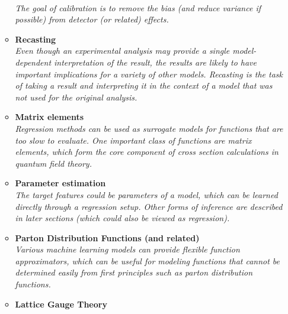 \documentclass[12pt,letterpaper]{article}
\begin{document}
\begin{itemize}
\begin{itemize}
		\\\textit{The goal of calibration is to remove the bias (and reduce variance if possible) from detector (or related) effects.}
		\item \textbf{Recasting}~\cite{Caron:2017hku,Bertone:2016mdy,1806026,Hammad:2022wpq}
		\\\textit{Even though an experimental analysis may provide a single model-dependent interpretation of the result, the results are likely to have important implications for a variety of other models.  Recasting is the task of taking a result and interpreting it in the context of a model that was not used for the original analysis.}
		\item \textbf{Matrix elements}~\cite{Badger:2020uow,Bishara:2019iwh,1804325,Bury:2020ewi,Sombillo:2021yxe,Sombillo:2021rxv,Aylett-Bullock:2021hmo,Maitre:2021uaa,Danziger:2021eeg,Winterhalder:2021ngy,Karl:2022jda,Alnuqaydan:2022ncd,Dersy:2022bym,Badger:2022hwf,Janssen:2023ahv,Maitre:2023dqz}
		\\\textit{Regression methods can be used as surrogate models for functions that are too slow to evaluate.  One important class of functions are matrix elements, which form the core component of cross section calculations in quantum field theory.}
		\item \textbf{Parameter estimation}~\cite{Lei:2020ucb,1808105,Lazzarin:2020uvv,Kim:2021pcz,Alda:2021rgt,Craven:2021ems,Castro:2022zpq,Meng:2022lmd,Qiu:2023ihi,Hammal:2023njz,Shi:2023xfz}
		\\\textit{The target features could be parameters of a model, which can be learned directly through a regression setup.  Other forms of inference are described in later sections (which could also be viewed as regression).}
		\item \textbf{Parton Distribution Functions (and related)}~\cite{DelDebbio:2020rgv,Grigsby:2020auv,Rossi:2020sbh,Carrazza:2021hny,Ball:2021leu,Ball:2021xlu,Khalek:2021gon,Iranipour:2022iak,Gao:2022uhg,Gao:2022srd,Candido:2023utz,Wang:2023nab,Kassabov:2023hbm,Wang:2023poi,Fernando:2023obn,Rabemananjara:2023xfq}
		\\\textit{Various machine learning models can provide flexible function approximators, which can be useful for modeling functions that cannot be determined easily from first principles such as parton distribution functions.}
		\item \textbf{Lattice Gauge Theory}~\cite{Kanwar:2003.06413,Favoni:2020reg,Bulusu:2021rqz,Shi:2021qri,Hackett:2021idh,Yoon:2018krb,Zhang:2019qiq,Nguyen:2019gpo,Favoni:2021epq,Chen:2021jey,Bulusu:2021njs,Shi:2022yqw,Luo:2022jzl,Chen:2022ytr,Li:2022ozl,Kang:2022jbg,Albandea:2022fky,Khan:2022vot,Sale:2022snt,Kim:2022rna,Karsch:2022yka,Favoni:2022mcg,Chen:2022asj,Bacchio:2022vje,Bacchio:2022vje,Gao:2022uhg,Aguilar:2022thg,Lawrence:2022dba,Peng:2022wdl,Lehner:2023bba,Albandea:2023wgd,Nicoli:2023qsl,Aronsson:2023rli,Zhou:2023pti,Hudspith:2023loy,R:2023dcr,Bender:2023gwr,NarcisoFerreira:2023kak,Lehner:2023prf,Riberdy:2023awf,Buzzicotti:2023qdv,Caselle:2023mvh}

\end{itemize}
\end{itemize}
\end{document}
